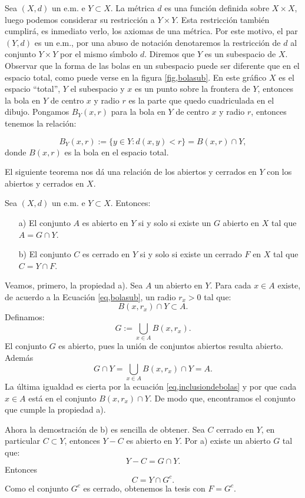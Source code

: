 Sea $(X,d)$ un e.m. e $Y\subset X$. La métrica $d$ es una
función definida sobre $X\times X$, luego podemos considerar su
restricción a $Y\times Y$. Esta restricción también
cumplirá, es inmediato verlo,  los axiomas de una métrica. Por
este motivo, el par $(Y,d)$ es un e.m., por una abuso de
notación denotaremos la restricción de $d$ al conjunto
$Y\times Y$ por el mismo s\'{\i}mbolo $d$.  Diremos que $Y$ es un
subespacio de $X$.  Observar que la forma de las bolas en un
subespacio puede ser diferente que en el espacio total, como puede
verse en la figura \vref{fig,bolasub}. En este gráfico $X$ es el
espacio ``total'', $Y$ el subespacio y $x$ es un punto sobre la
frontera de $Y$, entonces la bola en $Y$ de centro $x$ y radio $r$
es la parte que quedo cuadriculada en el dibujo. Pongamos
$B_Y(x,r)$ para la bola en $Y$ de centro  $x$ y radio $r$,
entonces tenemos la relación:

\begin{equation}\label{eq,bolasub}
    B_Y(x,r):=\{y\in Y: d(x,y)<r\}=B(x,r)\cap Y,
\end{equation}
donde $B(x,r)$ es la bola en el espacio total.



El siguiente teorema nos dá una relación de los abiertos y
cerrados en $Y$ con los abiertos y cerrados en $X$.

\begin{teorema}{} Sea $(X,d)$ un e.m. e $Y\subset X$. Entonces:
\begin{itemize}
\item[a)] El conjunto $A$ es abierto en $Y$ si y solo si existe un
$G$ abierto en $X$ tal que $A=G\cap Y$.
\item[b)] El conjunto $C$ es cerrado en $Y$ si y solo si existe un
cerrado $F$ en $X$ tal que $C=Y\cap F$.
\end{itemize}
\end{teorema}
\begin{demo} Veamos, primero, la propiedad a). Sea $A$ un abierto
en $Y$. Para cada $x\in A$ existe, de acuerdo a la Ecuación
\vref{eq,bolasub}, un radio $r_x>0$ tal que:
\begin{equation}\label{eq,inclusiondebolas}
    B(x,r_x)\cap Y\subset A.
\end{equation}
Definamos:
\[
    G:=\bigcup\limits_{x\in A}B(x,r_x).
\]
El conjunto $G$ es abierto, pues la unión de conjuntos abiertos
resulta abierto. Además
\[
    G\cap Y=\bigcup\limits_{x\in A}B(x,r_x)\cap Y= A.
\]
La última igualdad es cierta por la ecuación
\vref{eq,inclusiondebolas} y por que cada $x\in A$ está en el
conjunto $B(x,r_x)\cap Y$. De modo que, encontramos el conjunto
que cumple la propiedad a).

Ahora la demostración de b) es sencilla de obtener. Sea $C$
cerrado en $Y$, en particular $C\subset Y$, entonces $Y-C$ es
abierto en $Y$. Por a) existe un abierto $G$ tal que:
\[
    Y-C=G\cap Y.
\]
Entonces
\[C=Y\cap G^c.\]
Como el conjunto $G^c$ es cerrado, obtenemos la tesis con $F=G^c$.
\end{demo}

